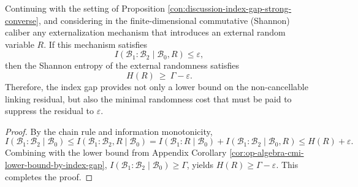 \begin{proposition}\label{con:discussion-randomness-cost-lower-bound}
Continuing with the setting of Proposition \ref{con:discussion-index-gap-strong-converse}, and considering in the finite-dimensional commutative (Shannon) caliber any externalization mechanism that introduces an external random variable \(R\).
If this mechanism satisfies
\[
I(\mathcal{B}_1:\mathcal{B}_2\mid\mathcal{B}_0,R)\le \varepsilon,
\]
then the Shannon entropy of the external randomness satisfies
\[
\boxed{\;H(R)\ \ge\ \Gamma-\varepsilon.\;}
\]
Therefore, the index gap provides not only a lower bound on the non-cancellable linking residual, but also the minimal randomness cost that must be paid to suppress the residual to \(\varepsilon\).
\end{proposition}
\begin{proof}
By the chain rule and information monotonicity,
\[
I(\mathcal{B}_1:\mathcal{B}_2\mid\mathcal{B}_0)
\le I(\mathcal{B}_1:\mathcal{B}_2,R\mid\mathcal{B}_0)
=I(\mathcal{B}_1:R\mid\mathcal{B}_0)+I(\mathcal{B}_1:\mathcal{B}_2\mid\mathcal{B}_0,R)
\le H(R)+\varepsilon.
\]
Combining with the lower bound from Appendix Corollary \ref{cor:op-algebra-cmi-lower-bound-by-index-gap},
\(
I(\mathcal{B}_1:\mathcal{B}_2\mid\mathcal{B}_0)\ge \Gamma
\),
yields \(H(R)\ge \Gamma-\varepsilon\). This completes the proof.
\end{proof}

